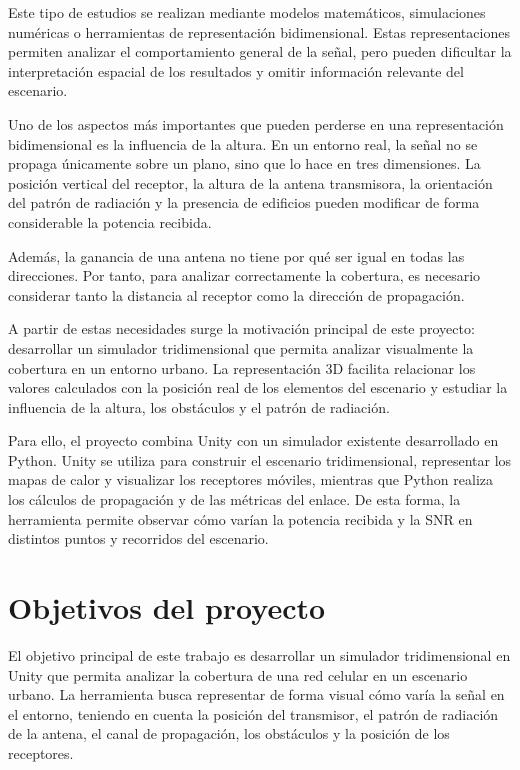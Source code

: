 Este tipo de estudios se realizan mediante modelos matemáticos, simulaciones numéricas o herramientas de representación bidimensional. Estas representaciones permiten analizar el comportamiento general de la señal, pero pueden dificultar la interpretación espacial de los resultados y omitir información relevante del escenario.

Uno de los aspectos más importantes que pueden perderse en una representación bidimensional es la influencia de la altura. En un entorno real, la señal no se propaga únicamente sobre un plano, sino que lo hace en tres dimensiones. La posición vertical del receptor, la altura de la antena transmisora, la orientación del patrón de radiación y la presencia de edificios pueden modificar de forma considerable la potencia recibida.

Además, la ganancia de una antena no tiene por qué ser igual en todas las direcciones. Por tanto, para analizar correctamente la cobertura, es necesario considerar tanto la distancia al receptor como la dirección de propagación.

A partir de estas necesidades surge la motivación principal de este proyecto: desarrollar un simulador tridimensional que permita analizar visualmente la cobertura en un entorno urbano. La representación 3D facilita relacionar los valores calculados con la posición real de los elementos del escenario y estudiar la influencia de la altura, los obstáculos y el patrón de radiación.

Para ello, el proyecto combina Unity con un simulador existente desarrollado en Python. Unity se utiliza para construir el escenario tridimensional, representar los mapas de calor y visualizar los receptores móviles, mientras que Python realiza los cálculos de propagación y de las métricas del enlace. De esta forma, la herramienta permite observar cómo varían la potencia recibida y la SNR en distintos puntos y recorridos del escenario.


\section{Objetivos del proyecto}

El objetivo principal de este trabajo es desarrollar un simulador tridimensional en Unity que permita analizar la cobertura de una red celular en un escenario urbano. La herramienta busca representar de forma visual cómo varía la señal en el entorno, teniendo en cuenta la posición del transmisor, el patrón de radiación de la antena, el canal de propagación, los obstáculos y la posición de los receptores.

